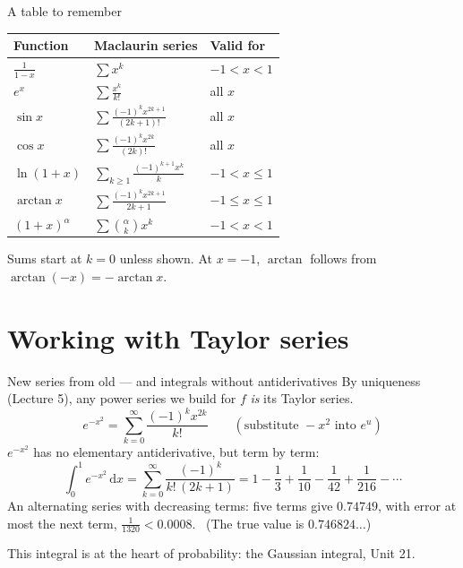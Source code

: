 \documentclass[10pt]{wosm-slides}
\newcommand{\dx}{\,\mathrm{d}x}
\begin{document}
\begin{frame}{A table to remember}
  \begin{center}
  \small\renewcommand{\arraystretch}{1.45}
  \begin{tabular}{@{}lll@{}}
    \toprule
    \textbf{Function} & \textbf{Maclaurin series} & \textbf{Valid for} \\
    \midrule
    $\frac{1}{1-x}$ & $\sum x^k$ & $-1 < x < 1$ \\
    $e^x$ & $\sum \frac{x^k}{k!}$ & all $x$ \\
    $\sin x$ & $\sum \frac{(-1)^k x^{2k+1}}{(2k+1)!}$ & all $x$ \\
    $\cos x$ & $\sum \frac{(-1)^k x^{2k}}{(2k)!}$ & all $x$ \\
    $\ln(1 + x)$ & $\sum_{k \ge 1} \frac{(-1)^{k+1} x^k}{k}$ & $-1 < x \le 1$ \\
    $\arctan x$ & $\sum \frac{(-1)^k x^{2k+1}}{2k+1}$ & $-1 \le x \le 1$ \\
    $(1 + x)^\alpha$ & $\sum \binom{\alpha}{k} x^k$ & $-1 < x < 1$ \\
    \bottomrule
  \end{tabular}
  \end{center}
  {\small Sums start at $k = 0$ unless shown. At $x = -1$, $\arctan$ follows from $\arctan(-x) = -\arctan x$.\par}
\end{frame}

\section{Working with Taylor series}

\begin{frame}{New series from old --- and integrals without antiderivatives}
  By uniqueness (Lecture 5), any power series we build for $f$ \emph{is} its Taylor series.
  \[ e^{-x^2} = \sum_{k=0}^\infty \frac{(-1)^k x^{2k}}{k!} \qquad (\text{substitute } -x^2 \text{ into } e^u) \]
  \pause
  $e^{-x^2}$ has no elementary antiderivative, but term by term:
  \[ \int_0^1 e^{-x^2} \dx = \sum_{k=0}^\infty \frac{(-1)^k}{k!\,(2k+1)}
     = 1 - \frac13 + \frac{1}{10} - \frac{1}{42} + \frac{1}{216} - \cdots \]
  \pause
  An alternating series with decreasing terms: five terms give $0.74749$, with error at most
  the next term, $\frac{1}{1320} < 0.0008$. \ (The true value is $0.746824\ldots$)
  {\small This integral is at the heart of probability: the Gaussian integral, Unit 21.\par}
\end{frame}
\end{document}
